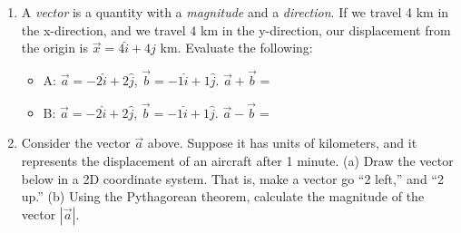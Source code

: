 \documentclass{article}
\begin{document}
\begin{enumerate}
\item A \textit{vector} is a quantity with a \textit{magnitude} and a \textit{direction}.  If we travel 4 km in the x-direction, and we travel 4 km in the y-direction, our displacement from the origin is $\vec{x} = 4 \hat{i} + 4\hat{j}$ km.  Evaluate the following:
\begin{itemize}
\item A: $\vec{a} = -2 \hat{i} + 2\hat{j}$, $\vec{b} = -1 \hat{i} + 1\hat{j}$.  $\vec{a} + \vec{b} = $
\item B: $\vec{a} = -2 \hat{i} + 2\hat{j}$, $\vec{b} = -1 \hat{i} + 1\hat{j}$.  $\vec{a} - \vec{b} = $
\end{itemize}
\vspace{1cm}
\item Consider the vector $\vec{a}$ above.  Suppose it has units of kilometers, and it represents the displacement of an aircraft after 1 minute.  (a) Draw the vector below in a 2D coordinate system.  That is, make a vector go ``2 left,'' and ``2 up.'' (b) Using the Pythagorean theorem, calculate the magnitude of the vector $|\vec{a}|$.
\end{enumerate}
\end{document}
